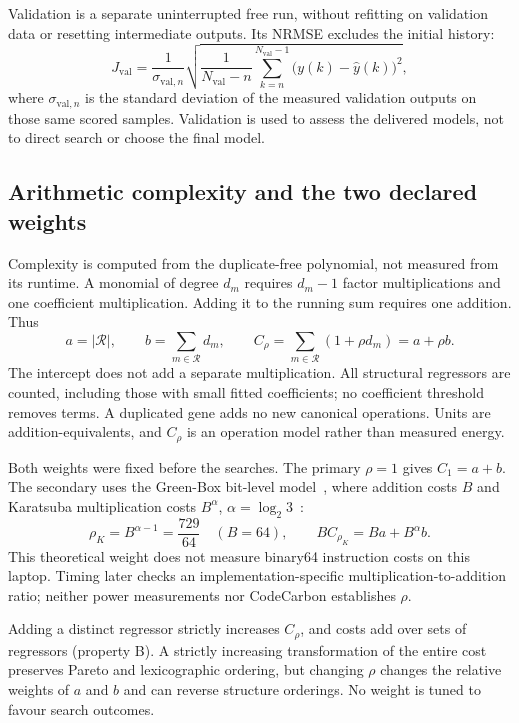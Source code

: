 \documentclass[11pt,a4paper]{article}
\theoremstyle{definition}
\theoremstyle{plain}
\theoremstyle{remark}
\begin{document}
Validation is a separate uninterrupted free run, without refitting on validation data or resetting intermediate outputs. Its NRMSE excludes the initial history:
\begin{equation}
J_{\mathrm{val}}=\frac{1}{\sigma_{\mathrm{val},n}}
\sqrt{\frac{1}{N_{\mathrm{val}}-n}\sum_{k=n}^{N_{\mathrm{val}}-1}
\big(y(k)-\hat y(k)\big)^2},
\label{eq:validation}
\end{equation}
where $\sigma_{\mathrm{val},n}$ is the standard deviation of the measured validation outputs on those same scored samples. Validation is used to assess the delivered models, not to direct search or choose the final model.

\subsection{Arithmetic complexity and the two declared weights}
Complexity is computed from the duplicate-free polynomial, not measured from its runtime. A monomial of degree $d_m$ requires $d_m-1$ factor multiplications and one coefficient multiplication. Adding it to the running sum requires one addition. Thus
\begin{equation}
a=|\mathcal R|,\qquad b=\sum_{m\in\mathcal R}d_m,\qquad
C_\rho=\sum_{m\in\mathcal R}(1+\rho d_m)=a+\rho b.
\label{eq:cost}
\end{equation}
The intercept does not add a separate multiplication. All structural regressors are counted, including those with small fitted coefficients; no coefficient threshold removes terms. A duplicated gene adds no new canonical operations. Units are addition-equivalents, and $C_\rho$ is an operation model rather than measured energy.

Both weights were fixed before the searches. The primary $\rho=1$ gives $C_1=a+b$. The secondary uses the Green-Box bit-level model~\cite{NMN2023}, where addition costs $B$ and Karatsuba multiplication costs $B^\alpha$, $\alpha=\log_2 3$~\cite{KO1963}:
\begin{equation}
\rho_K=B^{\alpha-1}=\frac{729}{64}\quad(B=64),\qquad
B C_{\rho_K}=Ba+B^\alpha b.
\label{eq:karatsuba}
\end{equation}
This theoretical weight does not measure binary64 instruction costs on this laptop. Timing later checks an implementation-specific multiplication-to-addition ratio; neither power measurements nor CodeCarbon establishes $\rho$.

Adding a distinct regressor strictly increases $C_\rho$, and costs add over sets of regressors (property B). A strictly increasing transformation of the entire cost preserves Pareto and lexicographic ordering, but changing $\rho$ changes the relative weights of $a$ and $b$ and can reverse structure orderings. No weight is tuned to favour search outcomes.
\end{document}
